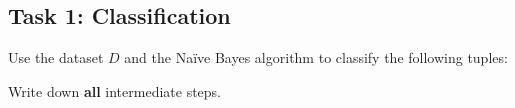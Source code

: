 \documentclass[
english,
smallborders
]{i6prcsht}
\begin{document}
\subsection*{Task 1: Classification}


Use the dataset $D$ and the Naïve Bayes algorithm to classify the following tuples:

\begin{center}
\end{center}


Write down \textbf{all} intermediate steps.
\end{document}
